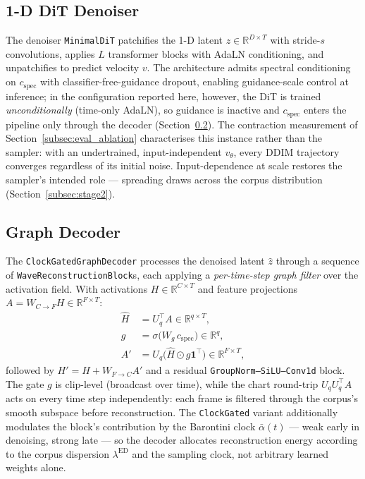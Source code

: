 \documentclass[12pt,a4paper]{article}
\begin{document}
\subsection{1-D DiT Denoiser}
\label{subsec:arch_dit}

The denoiser \texttt{MinimalDiT} patchifies the 1-D latent
$z \in \mathbb{R}^{D \times T}$ with stride-$s$ convolutions, applies
$L$ transformer blocks with AdaLN conditioning, and unpatchifies to
predict velocity $v$. The architecture admits spectral conditioning on
$c_{\mathrm{spec}}$ with classifier-free-guidance dropout, enabling
guidance-scale control at inference; in the configuration reported
here, however, the DiT is trained \emph{unconditionally} (time-only
AdaLN), so guidance is inactive and $c_{\mathrm{spec}}$ enters the
pipeline only through the decoder
(Section~\ref{subsec:arch_decoder}). The contraction measurement of
Section~\ref{subsec:eval_ablation} characterises this instance rather
than the sampler: with an undertrained, input-independent $v_\theta$,
every DDIM trajectory converges regardless of its initial noise.
Input-dependence at scale restores the sampler's intended role —
spreading draws across the corpus distribution
(Section~\ref{subsec:stage2}).

\subsection{Graph Decoder}
\label{subsec:arch_decoder}

The \texttt{ClockGatedGraphDecoder} processes the denoised latent
$\hat{z}$ through a sequence of \texttt{WaveReconstructionBlock}s, each
applying a \emph{per-time-step graph filter} over the activation field.
With activations $H \in \mathbb{R}^{C \times T}$ and feature projections
$A = W_{C\!\to\!F} H \in \mathbb{R}^{F \times T}$:
\begin{align}
  \hat{H} &= U_q^\top A \in \mathbb{R}^{q \times T},
  \label{eq:project_chart}\\
  g &= \sigma\!\bigl(W_g \, c_{\mathrm{spec}}\bigr) \in \mathbb{R}^{q},
  \label{eq:gate}\\
  A' &= U_q \bigl(\hat{H} \odot g \mathbf{1}^\top\bigr) \in \mathbb{R}^{F \times T},
  \label{eq:lift}
\end{align}
followed by $H' = H + W_{F\!\to\!C} A'$ and a residual
\texttt{GroupNorm--SiLU--Conv1d} block. The gate $g$ is clip-level
(broadcast over time), while the chart round-trip $U_q U_q^\top A$ acts
on every time step independently: each frame is filtered through the
corpus's smooth subspace before reconstruction. The
\texttt{ClockGated} variant additionally modulates the block's
contribution by the Barontini clock $\bar{\alpha}(t)$ — weak early in
denoising, strong late — so the decoder allocates reconstruction energy
according to the corpus dispersion $\lambda^{\mathrm{ED}}$ and the
sampling clock, not arbitrary learned weights alone.
\end{document}
